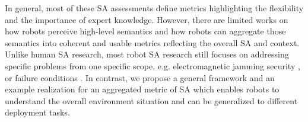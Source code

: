 In general, most of these SA assessments define metrics highlighting the flexibility and the importance of expert knowledge. However, there are limited works on how robots perceive high-level semantics and how robots can aggregate those semantics into coherent and usable metrics reflecting the overall SA and context. Unlike human SA research, most robot SA research still focuses on addressing specific problems from one specific scope, e.g. electromagnetic jamming security \cite{gao2020uav}, or failure conditions \cite{ginesi2020autonomous,ghezala2014rsaw}. In contrast, we propose a general framework and an example realization for an aggregated metric of SA which enables robots to understand the overall environment situation and can be generalized to different deployment tasks.